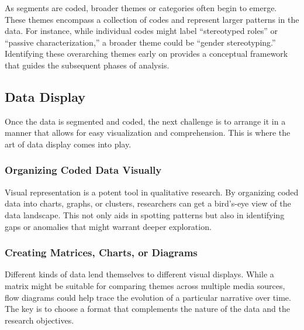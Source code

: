 \documentclass[
  b5paper]{book}
\begin{document}
As segments are coded, broader themes or categories often begin to emerge. These themes encompass a collection of codes and represent larger patterns in the data. For instance, while individual codes might label ``stereotyped roles'' or ``passive characterization,'' a broader theme could be ``gender stereotyping.'' Identifying these overarching themes early on provides a conceptual framework that guides the subsequent phases of analysis.

\hypertarget{data-display}{%
\subsection*{Data Display}\label{data-display}}

Once the data is segmented and coded, the next challenge is to arrange it in a manner that allows for easy visualization and comprehension. This is where the art of data display comes into play.

\hypertarget{organizing-coded-data-visually}{%
\subsubsection*{Organizing Coded Data Visually}\label{organizing-coded-data-visually}}

Visual representation is a potent tool in qualitative research. By organizing coded data into charts, graphs, or clusters, researchers can get a bird's-eye view of the data landscape. This not only aids in spotting patterns but also in identifying gaps or anomalies that might warrant deeper exploration.

\hypertarget{creating-matrices-charts-or-diagrams}{%
\subsubsection*{Creating Matrices, Charts, or Diagrams}\label{creating-matrices-charts-or-diagrams}}

Different kinds of data lend themselves to different visual displays. While a matrix might be suitable for comparing themes across multiple media sources, flow diagrams could help trace the evolution of a particular narrative over time. The key is to choose a format that complements the nature of the data and the research objectives.
\end{document}
